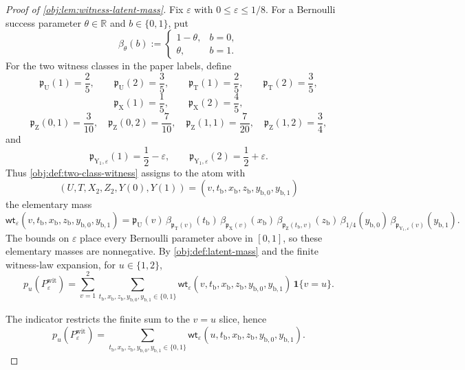 \documentclass[11pt]{article}
\begin{document}
\begin{proof}[Proof of \cref{obj:lem:witness-latent-mass}]
Fix \(\varepsilon\) with \(0\le \varepsilon\le 1/8\).  For a Bernoulli success
parameter \(\theta\in\mathbb R\) and \(b\in\{0,1\}\), put
\[
\beta_\theta(b):=
\begin{cases}
1-\theta,& b=0,\\
\theta,& b=1.
\end{cases}
\]
For the two witness classes in the paper labels, define
\[
\mathfrak p_{\mathrm U}(1)=\frac25,\qquad
\mathfrak p_{\mathrm U}(2)=\frac35,
\qquad
\mathfrak p_{\mathrm T}(1)=\frac25,\qquad
\mathfrak p_{\mathrm T}(2)=\frac35,
\]
\[
\mathfrak p_{\mathrm X}(1)=\frac15,\qquad
\mathfrak p_{\mathrm X}(2)=\frac45,
\]
\[
\mathfrak p_{\mathrm Z}(0,1)=\frac3{10},\quad
\mathfrak p_{\mathrm Z}(0,2)=\frac7{10},\quad
\mathfrak p_{\mathrm Z}(1,1)=\frac7{20},\quad
\mathfrak p_{\mathrm Z}(1,2)=\frac34,
\]
and
\[
\mathfrak p_{\mathrm Y_1,\varepsilon}(1)=\frac12-\varepsilon,
\qquad
\mathfrak p_{\mathrm Y_1,\varepsilon}(2)=\frac12+\varepsilon .
\]
Thus \cref{obj:def:two-class-witness} assigns to the atom with
\[
(U,T,X_2,Z_2,Y(0),Y(1))
=
(v,t_{\mathrm b},x_{\mathrm b},z_{\mathrm b},
 y_{\mathrm b,0},y_{\mathrm b,1})
\]
the elementary mass
\[
\mathsf{wt}_\varepsilon
(v,t_{\mathrm b},x_{\mathrm b},z_{\mathrm b},y_{\mathrm b,0},y_{\mathrm b,1})
=
\mathfrak p_{\mathrm U}(v)\,
\beta_{\mathfrak p_{\mathrm T}(v)}(t_{\mathrm b})\,
\beta_{\mathfrak p_{\mathrm X}(v)}(x_{\mathrm b})\,
\beta_{\mathfrak p_{\mathrm Z}(t_{\mathrm b},v)}(z_{\mathrm b})\,
\beta_{1/4}(y_{\mathrm b,0})\,
\beta_{\mathfrak p_{\mathrm Y_1,\varepsilon}(v)}(y_{\mathrm b,1}).
\]
The bounds on \(\varepsilon\) place every Bernoulli parameter above in
\([0,1]\), so these elementary masses are nonnegative.  By
\cref{obj:def:latent-mass} and the finite witness-law expansion, for
\(u\in\{1,2\}\),
\[
p_u(P_{\varepsilon}^{\mathrm{wit}})
=
\sum_{v=1}^{2}\sum_{t_{\mathrm b},x_{\mathrm b},z_{\mathrm b},
y_{\mathrm b,0},y_{\mathrm b,1}\in\{0,1\}}
\mathsf{wt}_\varepsilon
(v,t_{\mathrm b},x_{\mathrm b},z_{\mathrm b},y_{\mathrm b,0},y_{\mathrm b,1})
\,\mathbf 1\{v=u\}.
\] %

The indicator restricts the finite sum to the \(v=u\) slice, hence
\[
p_u(P_{\varepsilon}^{\mathrm{wit}})
=
\sum_{t_{\mathrm b},x_{\mathrm b},z_{\mathrm b},
y_{\mathrm b,0},y_{\mathrm b,1}\in\{0,1\}}
\mathsf{wt}_\varepsilon
(u,t_{\mathrm b},x_{\mathrm b},z_{\mathrm b},y_{\mathrm b,0},y_{\mathrm b,1}).
\] %


\end{proof}
\end{document}
